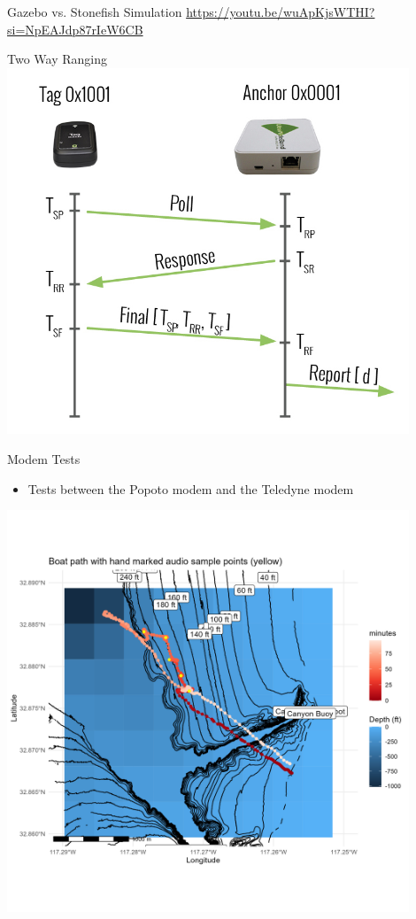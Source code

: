 \begin{frame}{Gazebo vs. Stonefish Simulation}
    \href{https://youtu.be/wuApKjsWTHI?si=NpEAJdp87rIeW6CB}{https://youtu.be/wuApKjsWTHI?si=NpEAJdp87rIeW6CB}
\end{frame}

\begin{frame}{Two Way Ranging}
    \centering
     \includegraphics[height=0.9\textheight,width=0.9\textwidth,keepaspectratio]{images/VOLT/twr.png}
\end{frame}
\begin{frame}{Modem Tests}
     \begin{itemize}
         \item Tests between the Popoto modem and the Teledyne modem
     \end{itemize}    
     \centering
     \includegraphics[height=0.9\textheight,width=0.9\textwidth,keepaspectratio]{images/VOLT/path_test_high_res.png}
 \end{frame}

